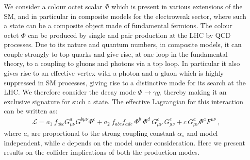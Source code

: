 \subsubsection{}
%

We consider a colour octet scalar $\Phi$ which is present in various extensions of the SM, and in particular in composite models for the electroweak sector, where such a state can be a composite object made of fundamental fermions. The colour octet $\Phi$ can be produced by single and pair production at the LHC by QCD processes.
Due to its nature and quantum numbers, in composite models, it can couple strongly to top quarks and give rise, at one loop in the 
fundamental theory, to a coupling to gluons and photons via a top loop. In particular it also gives rise to an effective vertex with a 
photon and a gluon which is highly suppressed in SM processes, giving rise to a distinctive mode for its search at the LHC. 
We therefore consider the decay mode $\Phi\rightarrow \gamma g$, thereby making it an exclusive signature for such a state. 
The effective Lagrangian for this interaction can be written as:
\begin{eqnarray}
\mathcal{L}=a_1~f_{abc}G^a_{\mu\nu}G^{b\mu\nu}\Phi^c+a_2~f_{abc}f_{ade}~\Phi^b~\Phi^d~G^c_{\mu\nu}~
G^e_{\mu\nu}+c~G^a_{\mu\nu}\Phi^aF^{\mu\nu}\,,
\end{eqnarray}
where $a_i$ are proportional to the strong coupling constant $\alpha_s$ and model independent, while $c$ depends on the model 
under consideration. Here we present results on the collider implications of both the production modes. 


